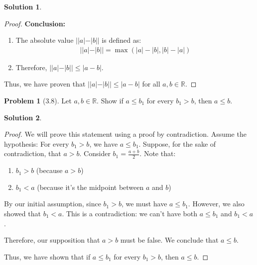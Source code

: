 \documentclass[12pt]{article}
\theoremstyle{definition} %
\newtheorem{solution}{Solution}
\newtheorem{problem}{Problem}
\theoremstyle{plain} %
\begin{document}
\begin{solution}
\begin{proof}
            \textbf{Conclusion:}
            \begin{enumerate}
                \item The absolute value $||a| - |b||$ is defined as:
                \begin{align}
                ||a| - |b|| = \max(|a| - |b|, |b| - |a|)
                \end{align}
                \item Therefore, $||a| - |b|| \leq |a - b|$.
            \end{enumerate}

        
        Thus, we have proven that $||a|-|b||\leq|a-b|$ for all $a,b \in \mathbb{R}$. 
    \end{proof}

\end{solution}







\begin{problem}[3.8]
 Let $a,b \in \mathbb{R}$. Show if $a\leq b_{1}$ for every $b_{1} > b$, then $a\leq b$.
   
\end{problem}

\begin{solution}
    \begin{proof}
     We will prove this statement using a proof by contradiction.
         Assume the hypothesis: For every $b_1 > b$, we have $a \leq b_1$.
         Suppose, for the sake of contradiction, that $a > b$.
         Consider $b_1 = \frac{a + b}{2}$. Note that:
        \begin{enumerate}
            \item $b_1 > b$ (because $a > b$)
            \item $b_1 < a$ (because it's the midpoint between $a$ and $b$)
        \end{enumerate}
        By our initial assumption, since $b_1 > b$, we must have $a \leq b_1$.
        However, we also showed that $b_1 < a$.
         This is a contradiction: we can't have both $a \leq b_1$ and $b_1 < a$.

    
    Therefore, our supposition that $a > b$ must be false. We conclude that $a \leq b$.
    
    Thus, we have shown that if $a \leq b_1$ for every $b_1 > b$, then $a \leq b$. 
    \end{proof}
    \end{solution}
\end{document}
